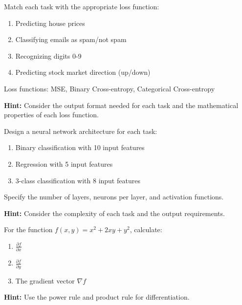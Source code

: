 \begin{problem}
\label{prob:loss-selection}

Match each task with the appropriate loss function:
\begin{enumerate}
    \item Predicting house prices
    \item Classifying emails as spam/not spam
    \item Recognizing digits 0-9
    \item Predicting stock market direction (up/down)
\end{enumerate}

Loss functions: MSE, Binary Cross-entropy, Categorical Cross-entropy

\textbf{Hint:} Consider the output format needed for each task and the mathematical properties of each loss function.
\end{problem}

\begin{problem}
\label{prob:architecture}

Design a neural network architecture for each task:
\begin{enumerate}
    \item Binary classification with 10 input features
    \item Regression with 5 input features
    \item 3-class classification with 8 input features
\end{enumerate}

Specify the number of layers, neurons per layer, and activation functions.

\textbf{Hint:} Consider the complexity of each task and the output requirements.
\end{problem}

\begin{problem}
\label{prob:gradient-calc}

For the function $f(x, y) = x^2 + 2xy + y^2$, calculate:
\begin{enumerate}
    \item $\frac{\partial f}{\partial x}$
    \item $\frac{\partial f}{\partial y}$
    \item The gradient vector $\nabla f$
\end{enumerate}

\textbf{Hint:} Use the power rule and product rule for differentiation.
\end{problem}

